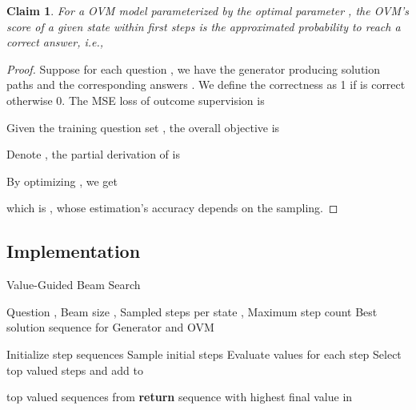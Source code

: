 \documentclass[11pt]{article}
\theoremstyle{plain}
\theoremstyle{claim}
\newtheorem{claim}{Claim}
\theoremstyle{rethinking}
\theoremstyle{researchquestion}
\theoremstyle{findings}
\theoremstyle{fact}
\theoremstyle{proper}
\theoremstyle{remark}
\begin{document}
\begin{claim}
    For a  OVM model  parameterized by the optimal parameter ,
the OVM's score of a given state within first  steps is the approximated probability to reach a correct answer, i.e.,
    
\end{claim}

\begin{proof}

Suppose for each question , we have the generator producing  solution paths  and the corresponding answers .
We define the correctness  as 1 if  is correct otherwise 0.
The MSE loss of outcome supervision is 


Given the training question set , 
the overall objective is


Denote , the partial derivation of  is
 

By optimizing , we get 
 
which is , whose estimation's accuracy depends on the sampling.





\end{proof}





\subsection{Implementation}


\begin{algorithm}[t]
\small
\caption{\label{algo:beam_search}Value-Guided Beam Search}
\begin{algorithmic}[1]

\State  Question , Beam size , Sampled steps per state , Maximum step count 
\State  Best solution sequence for 
\State  Generator  and OVM 

    \State Initialize step sequences 
    \State Sample initial steps 
    \State Evaluate values  for each step
    \State Select top  valued steps and add to 
    \State 
        \State 
        \State 
                \State 
                \State 
                \State 
                \State 
            \EndFor
        \EndFor

\State  top  valued sequences from 
        \State 
        \State 
    \EndWhile
    \State \textbf{return} sequence with highest final value in 
\EndProcedure

\end{algorithmic}
\end{algorithm}
\end{document}
